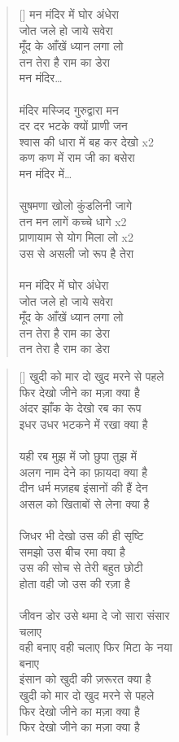 \begin{verse}[\versewidth]\texthindi{ 
मन मंदिर में घोर अंधेरा\\
जोत जले हो जाये सवेरा\\
मूँद के आँखें ध्यान लगा लो\\
तन तेरा है राम का डेरा\\
मन मंदिर…\\
\\
मंदिर मस्जिद गुरुद्वारा मन\\
दर दर भटके क्यों प्राणी जन\\
श्वास की धारा में बह कर देखो x2\\
कण कण में राम जी का बसेरा\\
मन मंदिर में…\\
\\
सुषमणा खोलो कुंडलिनी जागे\\
तन मन लागें कच्चे धागे x2\\
प्राणायाम से योग मिला लो x2\\
उस से असली जो रूप है तेरा\\
\\
मन मंदिर में घोर अंधेरा\\
जोत जले हो जाये सवेरा\\
मूँद के आँखें ध्यान लगा लो\\
तन तेरा है राम का डेरा\\
तन तेरा है राम का डेरा
}
\end{verse}

\begin{verse}[\versewidth]\texthindi{
खुदी को मार दो खुद मरने से पहले\\
फिर देखो जीने का मज़ा क्या है\\
अंदर झाँक के देखो रब का रूप\\
इधर उधर भटकने में रखा क्या है\\
\\
यही रब मुझ में जो छुपा तुझ में\\
अलग नाम देने का फ़ायदा क्या है\\
दीन धर्म मज़हब इंसानों की हैं देन\\
असल को खिताबों से लेना क्या है\\
\\
जिधर भी देखो उस की ही सृष्टि\\
समझो उस बीच रमा क्या है\\
उस की सोच से तेरी बहुत छोटी\\
होता वही जो उस की रज़ा है\\
\\
जीवन डोर उसे थमा दे जो सारा संसार\\
चलाए\\
वही बनाए वही चलाए फिर मिटा के नया\\
बनाए\\
इंसान को खुदी की ज़रूरत क्या है\\
खुदी को मार दो खुद मरने से पहले\\
फिर देखो जीने का मज़ा क्या है\\
फिर देखो जीने का मज़ा क्या है
}
\end{verse}

